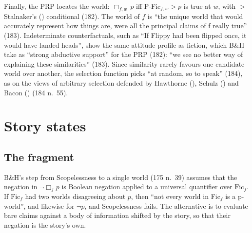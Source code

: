 \documentclass[
  11pt,
  letterpaper,
  DIV=11,
  numbers=noendperiod,
  twoside]{scrartcl}
\begin{document}
Finally, the PRP locates the world: \(\Box_{f,w}\, p\) iff
P-Fic\(_{f,w} > p\) is true at \(w\), with \(>\) Stalnaker's
() conditional (182). The world of
\(f\) is ``the unique world that would accurately represent how things
are, were all the principal claims of f really true'' (183).
Indeterminate counterfactuals, such as ``If Flippy had been flipped
once, it would have landed heads'', show the same attitude profile as
fiction, which B\&H take as ``strong abductive support'' for the PRP
(182): ``we see no better way of explaining these similarities'' (183).
Since similarity rarely favours one candidate world over another, the
selection function picks ``at random, so to speak'' (184), as on the
views of arbitrary selection defended by Hawthorne
(), Schulz
() and Bacon
() (184 n.~55).

\section{Story states}\label{sec-states}

\subsection{The fragment}\label{the-fragment}

B\&H's step from Scopelessness to a single world (175 n.~39) assumes
that the negation in \(\neg\Box_f p\) is Boolean negation applied to a
universal quantifier over \(\mathrm{Fic}_f\). If \(\mathrm{Fic}_f\) had
two worlds disagreeing about \(p\), then ``not every world in Fic\(_f\)
is a p-world'', and likewise for \(\neg p\), and Scopelessness fails.
The alternative is to evaluate bare claims against a body of information
shifted by the story, so that their negation is the story's own.
\end{document}
